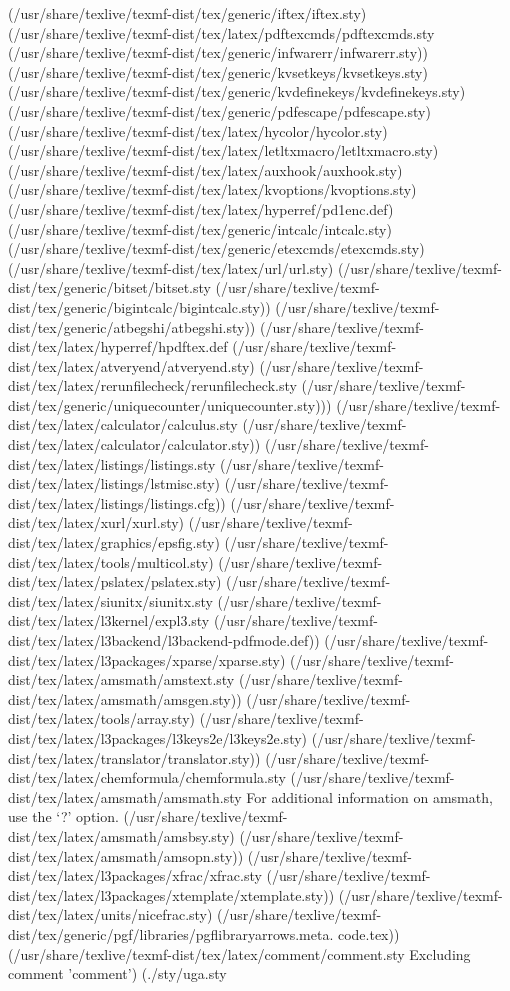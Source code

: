 (/usr/share/texlive/texmf-dist/tex/generic/iftex/iftex.sty)
(/usr/share/texlive/texmf-dist/tex/latex/pdftexcmds/pdftexcmds.sty
(/usr/share/texlive/texmf-dist/tex/generic/infwarerr/infwarerr.sty))
(/usr/share/texlive/texmf-dist/tex/generic/kvsetkeys/kvsetkeys.sty)
(/usr/share/texlive/texmf-dist/tex/generic/kvdefinekeys/kvdefinekeys.sty)
(/usr/share/texlive/texmf-dist/tex/generic/pdfescape/pdfescape.sty)
(/usr/share/texlive/texmf-dist/tex/latex/hycolor/hycolor.sty)
(/usr/share/texlive/texmf-dist/tex/latex/letltxmacro/letltxmacro.sty)
(/usr/share/texlive/texmf-dist/tex/latex/auxhook/auxhook.sty)
(/usr/share/texlive/texmf-dist/tex/latex/kvoptions/kvoptions.sty)
(/usr/share/texlive/texmf-dist/tex/latex/hyperref/pd1enc.def)
(/usr/share/texlive/texmf-dist/tex/generic/intcalc/intcalc.sty)
(/usr/share/texlive/texmf-dist/tex/generic/etexcmds/etexcmds.sty)
(/usr/share/texlive/texmf-dist/tex/latex/url/url.sty)
(/usr/share/texlive/texmf-dist/tex/generic/bitset/bitset.sty
(/usr/share/texlive/texmf-dist/tex/generic/bigintcalc/bigintcalc.sty))
(/usr/share/texlive/texmf-dist/tex/generic/atbegshi/atbegshi.sty))
(/usr/share/texlive/texmf-dist/tex/latex/hyperref/hpdftex.def
(/usr/share/texlive/texmf-dist/tex/latex/atveryend/atveryend.sty)
(/usr/share/texlive/texmf-dist/tex/latex/rerunfilecheck/rerunfilecheck.sty
(/usr/share/texlive/texmf-dist/tex/generic/uniquecounter/uniquecounter.sty)))
(/usr/share/texlive/texmf-dist/tex/latex/calculator/calculus.sty
(/usr/share/texlive/texmf-dist/tex/latex/calculator/calculator.sty))
(/usr/share/texlive/texmf-dist/tex/latex/listings/listings.sty
(/usr/share/texlive/texmf-dist/tex/latex/listings/lstmisc.sty)
(/usr/share/texlive/texmf-dist/tex/latex/listings/listings.cfg))
(/usr/share/texlive/texmf-dist/tex/latex/xurl/xurl.sty)
(/usr/share/texlive/texmf-dist/tex/latex/graphics/epsfig.sty)
(/usr/share/texlive/texmf-dist/tex/latex/tools/multicol.sty)
(/usr/share/texlive/texmf-dist/tex/latex/pslatex/pslatex.sty)
(/usr/share/texlive/texmf-dist/tex/latex/siunitx/siunitx.sty
(/usr/share/texlive/texmf-dist/tex/latex/l3kernel/expl3.sty
(/usr/share/texlive/texmf-dist/tex/latex/l3backend/l3backend-pdfmode.def))
(/usr/share/texlive/texmf-dist/tex/latex/l3packages/xparse/xparse.sty)
(/usr/share/texlive/texmf-dist/tex/latex/amsmath/amstext.sty
(/usr/share/texlive/texmf-dist/tex/latex/amsmath/amsgen.sty))
(/usr/share/texlive/texmf-dist/tex/latex/tools/array.sty)
(/usr/share/texlive/texmf-dist/tex/latex/l3packages/l3keys2e/l3keys2e.sty)
(/usr/share/texlive/texmf-dist/tex/latex/translator/translator.sty))
(/usr/share/texlive/texmf-dist/tex/latex/chemformula/chemformula.sty
(/usr/share/texlive/texmf-dist/tex/latex/amsmath/amsmath.sty
For additional information on amsmath, use the `?' option.
(/usr/share/texlive/texmf-dist/tex/latex/amsmath/amsbsy.sty)
(/usr/share/texlive/texmf-dist/tex/latex/amsmath/amsopn.sty))
(/usr/share/texlive/texmf-dist/tex/latex/l3packages/xfrac/xfrac.sty
(/usr/share/texlive/texmf-dist/tex/latex/l3packages/xtemplate/xtemplate.sty))
(/usr/share/texlive/texmf-dist/tex/latex/units/nicefrac.sty)
(/usr/share/texlive/texmf-dist/tex/generic/pgf/libraries/pgflibraryarrows.meta.
code.tex)) (/usr/share/texlive/texmf-dist/tex/latex/comment/comment.sty
Excluding comment 'comment') (./sty/uga.sty

